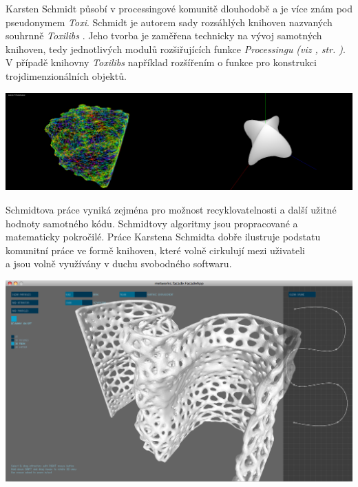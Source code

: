 \documentclass[10pt,twoside=true,open=right,cleardoublepage=empty,chapterprefix=true]{scrbook}
\newcommand{\odkaz}[1]{\textit{(viz \nameref{#1}, str. \pageref*{#1})}}
\begin{document}
Karsten Schmidt působí v processingové komunitě dlouhodobě a je více znám pod pseudonymem {\em Toxi}. Schmidt je autorem sady rozsáhlých knihoven nazvaných souhrnně {\em Toxilibs} . Jeho tvorba je zaměřena technicky na vývoj samotných knihoven, tedy jednotlivých modulů rozšiřujících funkce {\em Processingu} \odkaz{Knihovny}. V případě knihovny {\em Toxilibs} například rozšířením o funkce pro konstrukci trojdimenzionálních objektů.


\begin{center}
\includegraphics[width = 0.5\textwidth]{imgs/laplacian.png}\includegraphics[width = 0.5\textwidth]{imgs/smooth.png}


\end{center}

Schmidtova práce vyniká zejména pro možnost recyklovatelnosti a další užitné hodnoty samotného kódu. Schmidtovy algoritmy jsou propracované a matematicky pokročilé. Práce Karstena Schmidta dobře ilustruje podstatu komunitní práce ve formě knihoven, které volně cirkulují mezi uživateli \\a jsou volně využívány v duchu svobodného softwaru. 






\begin{center}
\includegraphics[width = 1\textwidth]{imgs/facade-7.png}

\end{center}
\end{document}
